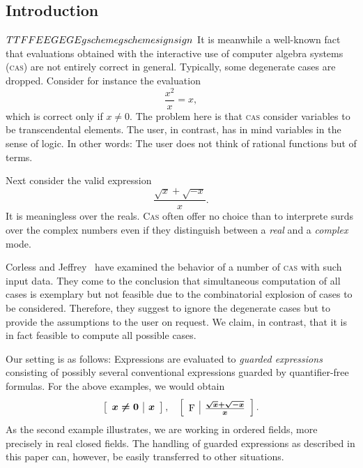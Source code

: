 
\newcommand{\gc}[1]{\mbox{\boldmath$#1$}}
\newcommand{\true}{\textrm{T}}
\newcommand{\false}{\textrm{F}}
\newcommand{\E}{\textrm{E}}
\newcommand{\GE}{\textrm{GE}}
\newcommand{\gscheme}{\textrm{gscheme}}
\newcommand{\sign}{\textrm{sign}}

\subsection{Introduction}
\ifdefined\HCode
\(
\newenvironment{gex}{\left[\begin{array}{c|c}}{\end{array}\right]}
\def\gc#1{\boldsymbol{#1}}
\def\true{\textrm{T}}
\def\false{\textrm{F}}
\def\E{\textrm{E}}
\def\GE{\textrm{GE}}
\def\gscheme{\textrm{gscheme}}
\def\sign{\textrm{sign}}
\)%
\fi
\def\gex{\left[\begin{array}{c|c}}
\def\endgex{\end{array}\right]}
It is meanwhile a well-known fact that evaluations obtained with the
interactive use of computer algebra systems (\textsc{cas}) are not
entirely correct in general. Typically, some degenerate cases are
dropped. Consider for instance the evaluation
\[
\frac{x^2}{x}=x,
\]
which is correct only if $x\neq0$.
The problem here is that \textsc{cas} consider variables to be
transcendental elements. The user, in contrast, has in mind variables
in the sense of logic. In other words: The user does not think of
rational functions but of terms.

Next consider the valid expression
\[
\frac{\sqrt{x}+\sqrt{-x}}{x}.
\]
It is meaningless over the reals. \textsc{Cas} often offer no choice than
to interprete surds over the complex numbers even if they distinguish
between a {\em real} and a {\em complex} mode.

Corless and Jeffrey~\cite{CorlessJeffrey:92} have examined the
behavior of a number of \textsc{cas} with such input data. They come to
the conclusion that simultaneous computation of all cases is exemplary
but not feasible due to the combinatorial explosion of cases to be
considered. Therefore, they suggest to ignore the degenerate cases but
to provide the assumptions to the user on request. We claim, in
contrast, that it is in fact feasible to compute all possible cases.

Our setting is as follows: Expressions are evaluated to {\em guarded
expressions} consisting of possibly several conventional expressions
guarded by quantifier-free formulas. For the above examples, we would
obtain
\[
\begin{gex}
\gc{x\neq0}&\gc{x}
\end{gex},\quad
\begin{gex}
\gc{\false}&\gc{\frac{\sqrt{x}+\sqrt{-x}}{x}}
\end{gex}.
\]
As the second example illustrates, we are working in ordered fields,
more precisely in real closed fields. The handling of guarded
expressions as described in this paper can, however, be easily
transferred to other situations.

